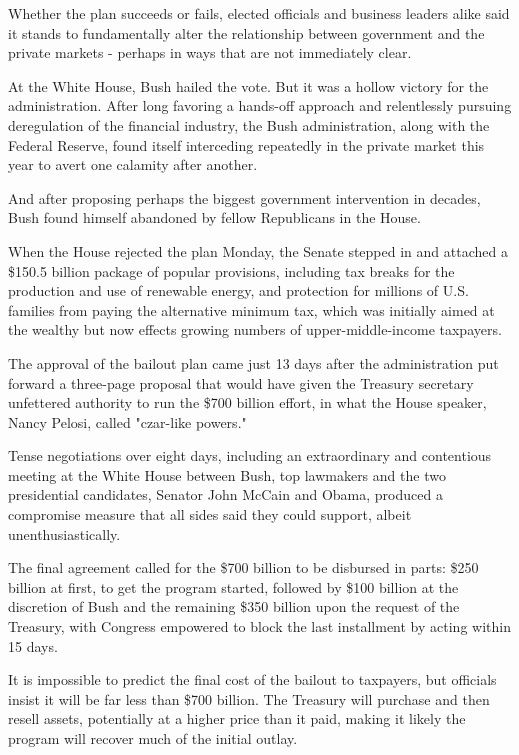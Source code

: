 Whether the plan succeeds or fails, elected officials and business
leaders alike said it stands to fundamentally alter the relationship
between government and the private markets - perhaps in ways that are
not immediately clear.

At the White House, Bush hailed the vote. But it was a hollow victory
for the administration. After long favoring a hands-off approach and
relentlessly pursuing deregulation of the financial industry, the Bush
administration, along with the Federal Reserve, found itself interceding
repeatedly in the private market this year to avert one calamity after
another.

And after proposing perhaps the biggest government intervention in
decades, Bush found himself abandoned by fellow Republicans in the
House.

When the House rejected the plan Monday, the Senate stepped in and
attached a \$150.5 billion package of popular provisions, including tax
breaks for the production and use of renewable energy, and protection
for millions of U.S. families from paying the alternative minimum tax,
which was initially aimed at the wealthy but now effects growing numbers
of upper-middle-income taxpayers.

The approval of the bailout plan came just 13 days after the
administration put forward a three-page proposal that would have given
the Treasury secretary unfettered authority to run the \$700 billion
effort, in what the House speaker, Nancy Pelosi, called "czar-like
powers."

Tense negotiations over eight days, including an extraordinary and
contentious meeting at the White House between Bush, top lawmakers and
the two presidential candidates, Senator John McCain and Obama, produced
a compromise measure that all sides said they could support, albeit
unenthusiastically.

The final agreement called for the \$700 billion to be disbursed in
parts: \$250 billion at first, to get the program started, followed by
\$100 billion at the discretion of Bush and the remaining \$350 billion
upon the request of the Treasury, with Congress empowered to block the
last installment by acting within 15 days.

It is impossible to predict the final cost of the bailout to taxpayers,
but officials insist it will be far less than \$700 billion. The
Treasury will purchase and then resell assets, potentially at a higher
price than it paid, making it likely the program will recover much of
the initial outlay.

